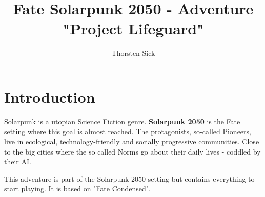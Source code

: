 \documentclass{book}
\title{Fate Solarpunk 2050 - Adventure "Project Lifeguard"}
\author{Thorsten Sick}
\begin{document}
\tableofcontents

\chapter{Introduction}


Solarpunk is a utopian Science Fiction genre. \textbf{Solarpunk 2050} is the Fate setting where this goal is almost reached. The protagonists, so-called Pioneers, live in ecological, technology-friendly and socially progressive communities. Close to the big cities where the so called Norms go about their daily lives - coddled by their AI.

This adventure is part of the Solarpunk 2050 setting but contains everything to start playing. It is based on "Fate Condensed".


\end{document}
